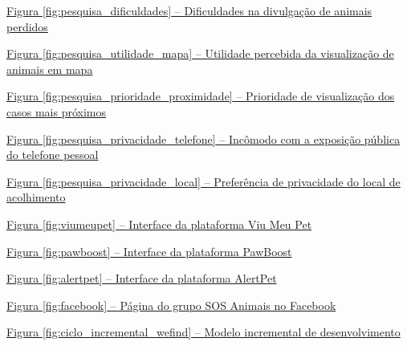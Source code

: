 \noindent \hyperref[fig:pesquisa_dificuldades]{Figura \ref*{fig:pesquisa_dificuldades} -- Dificuldades na divulgação de animais perdidos \dotfill \pageref{fig:pesquisa_dificuldades}}\par\vspace{0.12cm}
\noindent \hyperref[fig:pesquisa_utilidade_mapa]{Figura \ref*{fig:pesquisa_utilidade_mapa} -- Utilidade percebida da visualização de animais em mapa \dotfill \pageref{fig:pesquisa_utilidade_mapa}}\par\vspace{0.12cm}
\noindent \hyperref[fig:pesquisa_prioridade_proximidade]{Figura \ref*{fig:pesquisa_prioridade_proximidade} -- Prioridade de visualização dos casos mais próximos \dotfill \pageref{fig:pesquisa_prioridade_proximidade}}\par\vspace{0.12cm}
\noindent \hyperref[fig:pesquisa_privacidade_telefone]{Figura \ref*{fig:pesquisa_privacidade_telefone} -- Incômodo com a exposição pública do telefone pessoal \dotfill \pageref{fig:pesquisa_privacidade_telefone}}\par\vspace{0.12cm}
\noindent \hyperref[fig:pesquisa_privacidade_local]{Figura \ref*{fig:pesquisa_privacidade_local} -- Preferência de privacidade do local de acolhimento \dotfill \pageref{fig:pesquisa_privacidade_local}}\par\vspace{0.12cm}
\noindent \hyperref[fig:viumeupet]{Figura \ref*{fig:viumeupet} -- Interface da plataforma Viu Meu Pet \dotfill \pageref{fig:viumeupet}}\par\vspace{0.12cm}
\noindent \hyperref[fig:pawboost]{Figura \ref*{fig:pawboost} -- Interface da plataforma PawBoost \dotfill \pageref{fig:pawboost}}\par\vspace{0.12cm}
\noindent \hyperref[fig:alertpet]{Figura \ref*{fig:alertpet} -- Interface da plataforma AlertPet \dotfill \pageref{fig:alertpet}}\par\vspace{0.12cm}
\noindent \hyperref[fig:facebook]{Figura \ref*{fig:facebook} -- Página do grupo SOS Animais no Facebook \dotfill \pageref{fig:facebook}}\par\vspace{0.12cm}
\noindent \hyperref[fig:ciclo_incremental_wefind]{Figura \ref*{fig:ciclo_incremental_wefind} -- Modelo incremental de desenvolvimento \dotfill \pageref{fig:ciclo_incremental_wefind}}\par\vspace{0.12cm}
